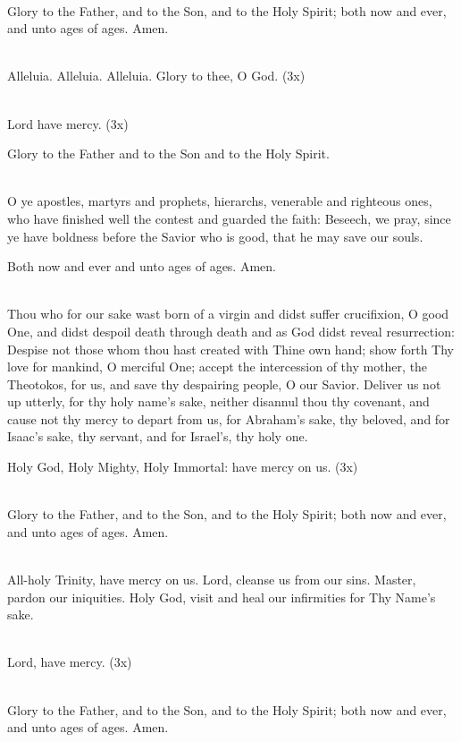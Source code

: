 {\mbox{}\\
Glory to the Father, and to the Son, and to the Holy Spirit;
both now and ever, 
and unto ages of ages. Amen.

\mbox{}\\
Alleluia. Alleluia. Alleluia. Glory to thee, O God. (3x)

\mbox{}\\
Lord have mercy. (3x)

Glory to the Father and to the Son and to the Holy Spirit.

\mbox{}\\ 
O ye apostles, martyrs and prophets, hierarchs,
venerable and righteous ones, who have 
finished well the contest and guarded the faith:
Beseech, we pray, since ye have boldness 
before the Savior who is good, that he may save our souls.
 
Both now and ever and unto ages of ages. Amen.

\mbox{}\\
Thou who for our sake wast born of a virgin and didst suffer crucifixion,
O good One, 
and didst despoil death through death and as God didst reveal resurrection:
Despise not those whom thou hast created with Thine own hand;
show forth Thy love for mankind,
O merciful One; accept the intercession of thy mother, the Theotokos,
for us, and save thy despairing people, O our Savior.
Deliver us not up utterly, for thy holy name’s sake,
neither disannul thou thy covenant, 
and cause not thy mercy to depart from us, for Abraham’s sake, thy beloved, and for Isaac’s sake, thy servant, and for Israel’s, thy holy one. 

Holy God, Holy Mighty, Holy Immortal: have mercy on us. (3x)

\mbox{}\\
Glory to the Father, and to the Son, and to the Holy Spirit;
both now and ever, 
and unto ages of ages. Amen.

\mbox{}\\
All-holy Trinity, have mercy on us. Lord, cleanse us from our sins. Master, 
pardon our iniquities.
Holy God, visit and heal our infirmities for Thy Name’s sake. 

\mbox{}\\
Lord, have mercy. (3x) 

\mbox{}\\
Glory to the Father, and to the Son, and to the Holy Spirit;
both now and ever,
and unto ages of ages. Amen. 

}
